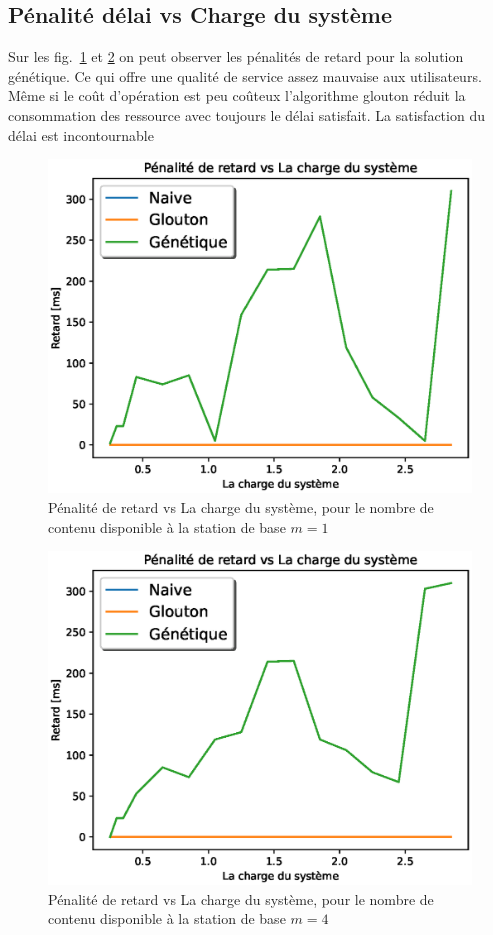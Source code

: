 \documentclass[runningheads]{llncs}
\begin{document}
\subsection{Pénalité délai vs Charge du syst\`eme}
Sur les fig.~\ref{fig:dvslm1} et \ref{fig:dvslm4} on peut observer les pénalités 
de retard pour la solution génétique. 
Ce qui offre une qualité de service assez mauvaise aux utilisateurs. Même si le 
coût d'opération est peu coûteux
l'algorithme glouton réduit la consommation des ressource avec toujours le délai satisfait.
La satisfaction du délai est incontournable
\begin{figure}[H]
    \includegraphics[width=\textwidth]{DvsL1.eps}
    \caption{Pénalité de retard vs La charge du système, pour 
    le nombre de contenu disponible \`a la station de base $m=1$ } 
    \label{fig:dvslm1}
\end{figure}
\begin{figure}[H]
    \includegraphics[width=\textwidth]{DvsL4.eps}
    \caption{Pénalité de retard vs La charge du système, pour 
    le nombre de contenu disponible \`a la station de base $m=4$ } 
    \label{fig:dvslm4}
\end{figure}
\end{document}
